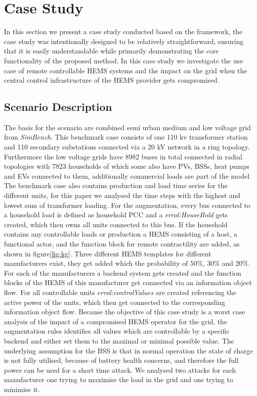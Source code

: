 \section{Case Study}
\label{sec:casestudy}

In this section we present a case study conducted based on the framework, the case study was intentionally designed to be relatively straightforward, ensuring that it is easily understandable while primarily demonstrating the core functionality of the proposed method. 
In this case study we investigate the use case of remote controllable \ac{HEMS} systems and the impact on the grid when the central control infrastructure of the \ac{HEMS} provider gets compromised.

\subsection{Scenario Description}
\label{subsec:scenario}

The basis for the scenario are combined semi urban medium and low voltage grid from \textit{SimBench}\cite{simbench}.
This benchmark case consists of one 110 kv transformer station and 110 secondary substations connected via a 20 kV network in a ring topology.
Furthermore the low voltage grids have 8982 buses in total connected in radial topologies with 7823 households of which some also have \acp{PV}, \acp{BSS}, heat pumps and \acp{EV} connected to them, additionally commercial loads are part of the model.
The benchmark case also contains production and load time series for the different units, for this paper we analysed the time steps with the highest and lowest sum of transformer loading.
For the augmentation, every bus connected to a household load is defined as household \ac{PCC} and a \textit{errol:HouseHold} gets created, which then owns all units connected to this bus.
If the household contains any controllable loads or production a \ac{HEMS} consisting of a host, a functional actor, and the function block for remote contractility are added, as shown in figure\ref{fig:kg}.
Three different \ac{HEMS} templates for different manufacturers exist, they get added which the probability of 50\%, 30\% and 20\%.
For each of the manufacturers a backend system gets created and the function blocks of the \ac{HEMS} of this manufacturer get connected via an information object flow.
For all controllable units \textit{errol:controlValues} are created referencing the active power of the units, which then get connected to the corresponding information object flow.
Because the objective of this case study is a worst case analysis of the impact of a compromised \ac{HEMS} operator for the grid, the augmentation rules identifies all values which are controllable by a specific backend and either set them to the maximal or minimal possible value.
The underlying assumption for the \ac{BSS} is that in normal operation the state of charge is not fully utilised, because of battery health concerns, and therefore the full power can be used for a short time attack.
We analysed two attacks for each manufacturer one trying to maximise the load in the grid and one trying to minimise it.

